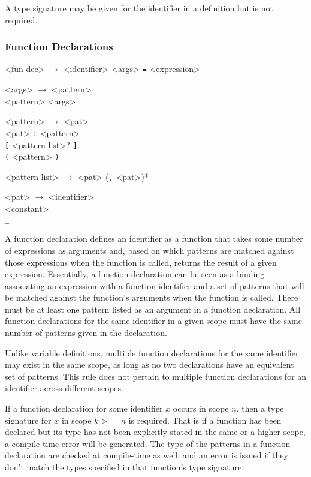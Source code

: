 A type signature may be given for the identifier in a definition but is not required.

\subsubsection{Function Declarations}

\setlength{\grammarindent}{5em}
\begin{grammar}

<fun-dec> $\rightarrow$ <identifier> <args> \texttt{=} <expression>

<args> $\rightarrow$ <pattern> \\ <pattern> <args> 


<pattern> $\rightarrow$ <pat> \\ <pat> \texttt{:} <pattern> \\ \texttt{[} <pattern-list>$?$ \texttt{]} \\
												\texttt{(} <pattern> \texttt{)} 

<pattern-list> $\rightarrow$ <pat> (\texttt{,} <pat>)* 

<pat> $\rightarrow$ <identifier> \\ <constant> \\ \texttt{_}
												
\end{grammar}

A function declaration defines an identifier as a function that takes
some number of expressions as arguments and, based on which patterns are matched
against those expressions when the function is called, returns the result
of a given expression. Essentially, a function declaration can be seen as a 
binding associating an expression with a function identifier and a set of patterns that will be matched
against the function's arguments when the function is called.
There must be at least one pattern listed
as an argument in a function declaration. All function declarations for the same identifier
in a given scope must have the same number of patterns given in the declaration.

Unlike variable definitions, multiple function declarations for the same identifier may exist
in the same scope, as long as no two declarations have an equivalent set of patterns. This rule does not pertain
to multiple function declarations for an identifier across different scopes.

If a function declaration for some identifier $x$ occurs in scope $n$, then
a type signature for $x$ in scope $k>=n$ is required. That is if a function has
been declared but its type has not been explicitly stated in the same or a higher
scope, a compile-time error will be generated. The type of the patterns in a function declaration
are checked at compile-time as well, and an error
is issued if they don't match the types specified in that function's 
type signature.


